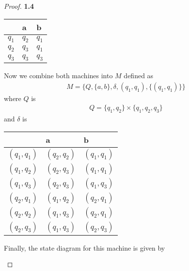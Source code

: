 \documentclass[11pt]{article}
\theoremstyle{definition}
\begin{document}
\begin{proof}{\textbf{1.4}}
\begin{itemize}
        \begin{center}
        \begin{tabular}{l|ll}
                  & a     & b     \\ \hline
            $q_1$ & $q_2$ & $q_1$ \\
            $q_2$ & $q_3$ & $q_1$ \\
            $q_3$ & $q_3$ & $q_3$ \\
        \end{tabular}
        \end{center}
        Now we combine both machines into $M$ defined as
        \begin{align*}
            M = \{Q, \{a,b\}, \delta, (q_1,q_1), \{(q_1, q_1)\}\}
        \end{align*}
        where $Q$ is 
        \begin{align*}
            Q =\{q_1, q_2\} \times \{q_1, q_2, q_3\}
        \end{align*}
        and $\delta$ is 
        \begin{center}
        \begin{tabular}{l|ll}
                  & a     & b     \\ \hline
            $(q_1, q_1)$ & $(q_2, q_2)$ & $(q_1, q_1)$ \\
            $(q_1, q_2)$ & $(q_2, q_3)$ & $(q_1, q_1)$ \\
            $(q_1, q_3)$ & $(q_2, q_3)$ & $(q_1, q_3)$ \\
            $(q_2, q_1)$ & $(q_1, q_2)$ & $(q_2, q_1)$ \\
            $(q_2, q_2)$ & $(q_1, q_3)$ & $(q_2, q_1)$ \\
            $(q_2, q_3)$ & $(q_1, q_3)$ & $(q_2, q_3)$ \\
        \end{tabular}
        \end{center}
        Finally, the state diagram for this machine is given by
        \begin{figure}[H]
            \centering %
\end{figure}
\end{itemize}
\end{proof}
\end{document}
